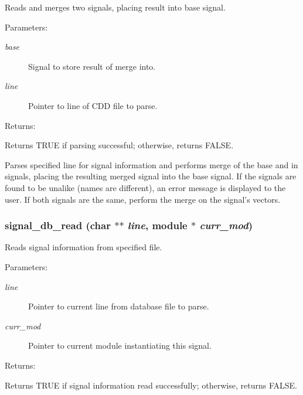 Reads and merges two signals, placing result into base signal.

\begin{Desc}
\item[Parameters: ]\par
\begin{description}
\item[{\em 
base}]Signal to store result of merge into. \item[{\em 
line}]Pointer to line of CDD file to parse.\end{description}
\end{Desc}
\begin{Desc}
\item[Returns: ]\par
Returns TRUE if parsing successful; otherwise, returns FALSE.\end{Desc}
Parses specified line for signal information and performs merge  of the base and in signals, placing the resulting merged signal  into the base signal. If the signals are found to be unalike  (names are different), an error message is displayed to the user.  If both signals are the same, perform the merge on the signal's  vectors. 
\subsubsection{ signal\_\-db\_\-read (char $\ast$$\ast$ {\em line}, {\bf module} $\ast$ {\em curr\_\-mod})}\label{signal_8c_a5}


Reads signal information from specified file.

\begin{Desc}
\item[Parameters: ]\par
\begin{description}
\item[{\em 
line}]Pointer to current line from database file to parse. \item[{\em 
curr\_\-mod}]Pointer to current module instantiating this signal.\end{description}
\end{Desc}
\begin{Desc}
\item[Returns: ]\par
Returns TRUE if signal information read successfully; otherwise, returns FALSE.\end{Desc}


